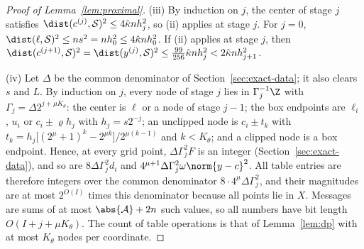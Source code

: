 \begin{proof}[Proof of Lemma~\ref{lem:proximal}]
(iii) By induction on $j$, the center of stage $j$ satisfies
$\dist(c^{(j)},\mathcal S)^2\le4\hat\kappa nh_j^2$, so (ii) applies at stage
$j$. For $j=0$, $\dist(\ell,\mathcal S)^2\le ns^2=nh_0^2\le4\hat\kappa nh_0^2$.
If (ii) applies at stage $j$, then
$\dist(c^{(j+1)},\mathcal S)^2=\dist(y^{(j)},\mathcal S)^2
\le\frac{99}{256}\hat\kappa nh_j^2<2\hat\kappa nh_{j+1}^2$.

(iv) Let $\Delta$ be the common denominator of Section~\ref{sec:exact-data};
it also clears $s$ and $L$. By induction on $j$, every node of stage $j$ lies
in $\Gamma_j^{-1}\Z$ with $\Gamma_j=\Delta2^{j+\mu K_\theta}$: the center is
$\ell$ or a node of stage $j-1$; the box endpoints are $\ell_i$, $u_i$ or
$c_i\pm\varrho h_j$ with $h_j=s2^{-j}$; an unclipped node is $c_i\pm t_k$ with
$t_k=h_j\bigl[(2^\mu+1)^k-2^{\mu k}\bigr]/2^{\mu(k-1)}$ and $k<K_\theta$; and a
clipped node is a box endpoint. Hence, at every grid point, $\Delta\Gamma_j^2F$
is an integer (Section~\ref{sec:exact-data}), and so are $8\Delta\Gamma_j^2d_i$
and $4^{\mu+1}\Delta\Gamma_j^2\omega\norm{y-c}^2$. All table entries are
therefore integers over the common denominator $8\cdot4^\mu\Delta\Gamma_j^2$,
and their magnitudes are at most $2^{O(I)}$ times this denominator because
all points lie in $X$. Messages are sums of at most $\abs{\mathcal A}+2n$
such values, so all numbers have bit length $O(I+j+\mu K_\theta)$. The count
of table operations is that of Lemma~\ref{lem:dp} with at most $K_\theta$
nodes per coordinate.
\end{proof}

